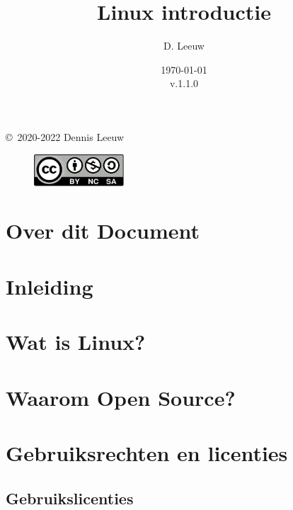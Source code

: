 \documentclass[a4paper,12pt,twoside,openright,titlepage]{book}
\author{D. Leeuw}
\title{Linux introductie}
\date{\today\\v.1.1.0}
\begin{document}

\maketitle

\copyright\ 2020-2022 Dennis Leeuw\\

\begin{figure}
\includegraphics[width=0.3\textwidth]{linuxreader-img001.png}
\end{figure}

\bigskip




\frontmatter
\chapter{Over dit Document}



\tableofcontents

\mainmatter
\chapter{Inleiding}


\chapter{Wat is Linux?}


\chapter{Waarom Open Source?}


\chapter{Gebruiksrechten en licenties}

\section{Gebruikslicenties}
\end{document}

